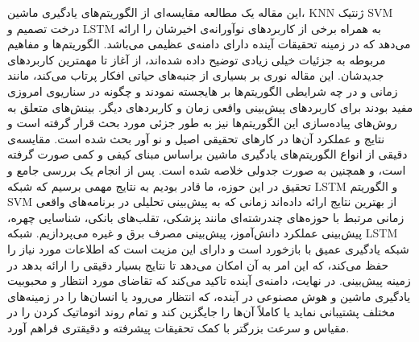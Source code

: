 \documentclass{CSICC2020}
\begin{document}
این مقاله یک مطالعه مقایسه‌ای از الگوریتم‌های یادگیری ماشین، KNN ژنتیک SVM درخت تصمیم و LSTM به همراه برخی از کاربردهای نوآورانه‌ی اخیرشان را ارائه می‌دهد که در زمینه تحقیقات آینده دارای دامنه‌ی عظیمی می‌باشد. الگوریتم‌ها و مفاهیم مربوطه به جزئیات خیلی زیادی توضیح داده شده‌اند، از آغاز تا مهمترین کاربردهای جدیدشان. این مقاله نوری بر بسیاری از جنبه‌های حیاتی افکار پرتاب می‌کند، مانند زمانی و در چه شرایطی الگوریتم‌ها بر هایجسته نمودند و چگونه در سناریوی امروزی مفید بودند برای کاربردهای پیش‌بینی واقعی زمان و کاربردهای دیگر. بینش‌های متعلق به روش‌های پیاده‌سازی این الگوریتم‌ها نیز به طور جزئی مورد بحث قرار گرفته است و نتایج و عملکرد آن‌ها در کارهای تحقیقی اصیل و نو آور بحث شده است. مقایسه‌ی دقیقی از انواع الگوریتم‌های یادگیری ماشین براساس مبنای کیفی و کمی صورت گرفته است، و همچنین به صورت جدولی خلاصه شده است. پس از انجام یک بررسی جامع و تحقیق در این حوزه، ما قادر بودیم به نتایج مهمی برسیم که شبکه LSTM و الگوریتم SVM از بهترین نتایج ارائه داده‌اند زمانی که به پیش‌بینی تحلیلی در برنامه‌های واقعی زمانی مرتبط با حوزه‌های چندرشته‌ای مانند پزشکی، تقلب‌های بانکی، شناسایی چهره، پیش‌بینی عملکرد دانش‌آموز، پیش‌بینی مصرف برق و غیره می‌پردازیم. شبکه LSTM شبکه یادگیری عمیق با بازخورد است و دارای این مزیت است که اطلاعات مورد نیاز را حفظ می‌کند، که این امر به آن امکان می‌دهد تا نتایج بسیار دقیقی را ارائه بدهد در زمینه پیش‌بینی. در نهایت، دامنه‌ی آینده تاکید می‌کند که تقاضای مورد انتظار و محبوبیت یادگیری ماشین و هوش مصنوعی در آینده، که انتظار می‌رود یا انسان‌ها را در زمینه‌های مختلف پشتیبانی نماید یا کاملاً آن‌ها را جایگزین کند و تمام روند اتوماتیک کردن را در مقیاس و سرعت بزرگتر با کمک تحقیقات پیشرفته و دقیقتری فراهم آورد. 
\end{document}
